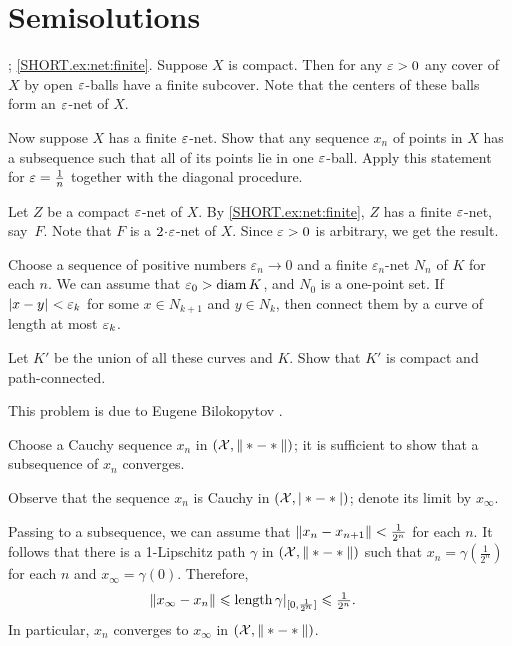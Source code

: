 
\chapter{Semisolutions}

\parbf{\ref{ex:net}};
\ref{SHORT.ex:net:finite}.
Suppose $X$ is compact.
Then for any $\varepsilon>0$ any cover of $X$ by open $\varepsilon$-balls have a finite subcover.
Note that the centers of these balls form an $\varepsilon$-net of $X$.

Now suppose $X$ has a finite $\varepsilon$-net.
Show that any sequence $x_n$ of points in $X$ has a subsequence such that all of its points lie in one $\varepsilon$-ball.
Apply this statement for $\varepsilon=\tfrac1n$ together with the diagonal procedure.

Let $Z$ be a compact $\varepsilon$-net of $X$.
By \ref{SHORT.ex:net:finite}, $Z$ has a finite $\varepsilon$-net, say~$F$.
Note that $F$ is a $2\cdot\eps$-net of $X$.
Since $\varepsilon>0$ is arbitrary, we get the result.

Choose a sequence of positive numbers $\varepsilon_n\to 0$ and a finite $\varepsilon_n$-net $N_n$ of $K$ for each $n$.
We can assume that $\varepsilon_0>\operatorname{\rm diam}\nolimits K$, and $N_0$ is a one-point set.
If $|{x}-{y}|_{}^{{}}<\varepsilon_k$ for some $x\in N_{k+1}$ and $y\in N_{k}$, then connect them by a curve of length at most $\varepsilon_k$.

Let $K'$ be the union of all these curves and $K$.
Show that $K'$ is compact and path-connected.

 This problem is due to Eugene Bilokopytov \cite{bilokopytov}.

Choose a Cauchy sequence $x_n$ in $(\mathcal{X},\|*-*\|)$; it is sufficient to show that a subsequence of $x_n$ converges.

Observe that the sequence $x_n$ is Cauchy in $(\mathcal{X},|*-*|)$;
denote its limit by $x_\infty$.

Passing to a subsequence, we can assume that $\|x_n-x_{n+1}\|<\tfrac1{2^n}$ for each $n$.
It follows that there is a 1-Lipschitz path $\gamma$ in $(\mathcal{X},\|*-*\|)$ such that $x_n=\gamma(\tfrac1{2^n})$ for each $n$ and $x_\infty=\gamma(0)$.
Therefore,
\begin{align*}
\|x_\infty-x_n\|&\leqslant \mathop{\rm length}\nolimits\gamma|_{[0,\frac1{2^n}]}\leqslant \tfrac1{2^n}.
\end{align*}
In particular, $x_n$ converges to $x_\infty$ in $(\mathcal{X},\|*-*\|)$.

